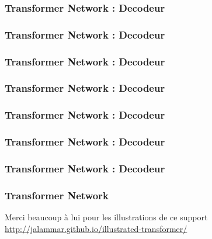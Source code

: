 \begin{frame}
  \frametitle{Transformer Network : Decodeur}
\end{frame}

\begin{frame}
  \frametitle{Transformer Network : Decodeur}
\end{frame}

\begin{frame}
  \frametitle{Transformer Network : Decodeur}
\end{frame}

\begin{frame}
  \frametitle{Transformer Network : Decodeur}
\end{frame}

\begin{frame}
  \frametitle{Transformer Network : Decodeur}
\end{frame}

\begin{frame}
  \frametitle{Transformer Network : Decodeur}
\end{frame}

\begin{frame}
  \frametitle{Transformer Network : Decodeur}
\end{frame}

\begin{frame}
  \frametitle{Transformer Network}
  Merci beaucoup à lui pour les illustrations de ce support
  \url{http://jalammar.github.io/illustrated-transformer/}
\end{frame}

